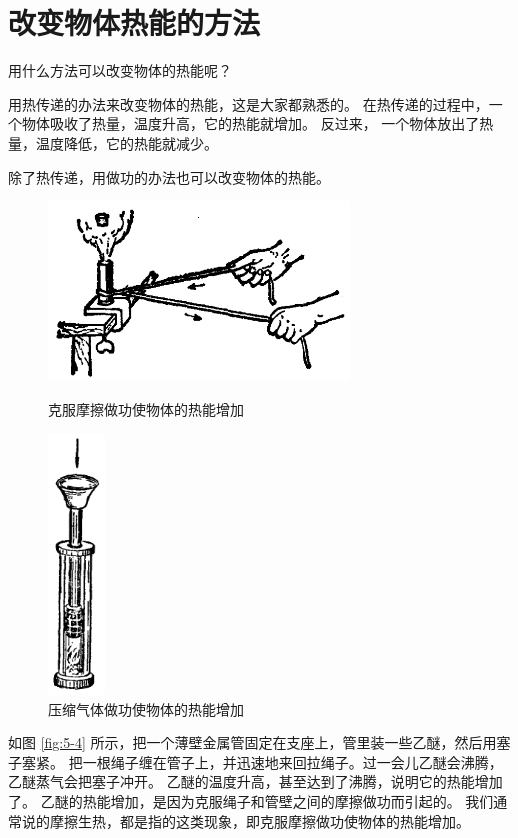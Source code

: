 \section{改变物体热能的方法}\label{sec:5-4}

用什么方法可以改变物体的热能呢？

用热传递的办法来改变物体的热能，这是大家都熟悉的。
在热传递的过程中，一个物体吸收了热量，温度升高，它的热能就增加。
反过来，         一个物体放出了热量，温度降低，它的热能就减少。

除了热传递，用做功的办法也可以改变物体的热能。

\begin{figure}[htbp]
    \centering
    \begin{minipage}{9cm}
    \centering
    \vspace{2cm}
    \includegraphics[width=8cm]{../pic/czwl2-ch5-4}
    \caption{克服摩擦做功使物体的热能增加}\label{fig:5-4}
    \end{minipage}
    \qquad
    \begin{minipage}{5cm}
    \centering
    \includegraphics[width=1.5cm]{../pic/czwl2-ch5-5}
    \caption{压缩气体做功使物体的热能增加}\label{fig:5-5}
    \end{minipage}
\end{figure}

如图 \ref{fig:5-4} 所示，把一个薄壁金属管固定在支座上，管里装一些乙醚，然后用塞子塞紧。
把一根绳子缠在管子上，并迅速地来回拉绳子。过一会儿乙醚会沸腾，乙醚蒸气会把塞子冲开。
乙醚的温度升高，甚至达到了沸腾，说明它的热能增加了。
乙醚的热能增加，是因为克服绳子和管壁之间的摩擦做功而引起的。
我们通常说的摩擦生热，都是指的这类现象，即克服摩擦做功使物体的热能增加。

